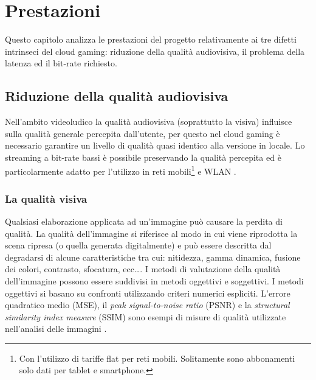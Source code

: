 %
%

\chapter{Prestazioni} \label{cap:cap4}
Questo capitolo analizza le prestazioni del progetto relativamente ai tre difetti intrinseci del cloud gaming: riduzione della qualità audiovisiva, il problema della latenza ed il bit-rate richiesto.



\section{Riduzione della qualità audiovisiva}
Nell'ambito videoludico la qualità audiovisiva (soprattutto la visiva) influisce sulla qualità generale percepita dall'utente, per questo nel cloud gaming è necessario garantire un livello di qualità quasi identico alla versione in locale. Lo streaming a bit-rate bassi è possibile preservando la qualità percepita ed è particolarmente adatto per l'utilizzo in reti mobili\footnote{Con l'utilizzo di tariffe flat per reti mobili. Solitamente sono abbonamenti solo dati per tablet e smartphone.} e WLAN \parencite{VideoAndMultimediaTransmissionsOverCellularNetworks}.



\subsection{La qualità visiva}
Qualsiasi elaborazione applicata ad un'immagine può causare la perdita di qualità. La qualità dell'immagine si riferisce al modo in cui viene riprodotta la scena ripresa (o quella generata digitalmente) e può essere descritta dal degradarsi di alcune caratteristiche tra cui: nitidezza, gamma dinamica, fusione dei colori, contrasto, sfocatura, ecc\dots. I metodi di valutazione della qualità dell'immagine possono essere suddivisi in metodi oggettivi e soggettivi. I metodi oggettivi si basano su confronti utilizzando criteri numerici espliciti. L'errore quadratico medio (MSE), il \textit{peak signal-to-noise ratio} (PSNR) e la \textit{structural similarity index measure} (SSIM) sono esempi di misure di qualità utilizzate nell'analisi delle immagini \parencite{relationship_PSNR_and_SSI}.



